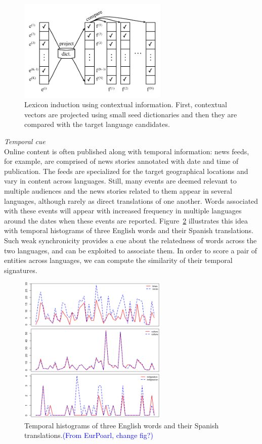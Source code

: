\documentclass{article}
\newcommand{\todo}[1]{\textcolor{blue}{(#1)}}
\newcommand{\figref}[1]{Figure~\ref{#1}}
\begin{document}
\begin{figure}
\centerline{\mbox{\includegraphics[width=2.8in]{figures/contextual}}}
\caption{Lexicon induction using contextual information. First, contextual vectors are projected using small seed dictionaries and then they are compared with the target language candidates.}
\label{fig:contextual}
\end{figure}

\noindent\emph{Temporal cue} \\

Online content is often published along with temporal information: news feeds, for example, are comprised of news stories annotated with date and time of publication.  The feeds are specialized for the target geographical locations and vary in content across languages.  Still, many events are deemed relevant to multiple audiences and the news stories related to them appear in several languages, although rarely as direct translations of one another.  Words associated with these events will appear with increased frequency in multiple languages around the dates when these events are reported.  \figref{fig:temporal} illustrates this idea with temporal histograms of three English words and their Spanish translations. Such weak synchronicity provides a cue about the relatedness of words across the two languages, and can be exploited to associate them.  In order to score a pair of entities across languages, we can compute the similarity of their temporal signatures.\\

\begin{figure}[h]
\centerline{\mbox{\includegraphics[width=2.8in]{figures/temporal}}}
\caption{Temporal histograms of three English words and their Spanish translations.\todo{From EurPoarl, change fig?}}
\label{fig:temporal}
\end{figure}
\end{document}
